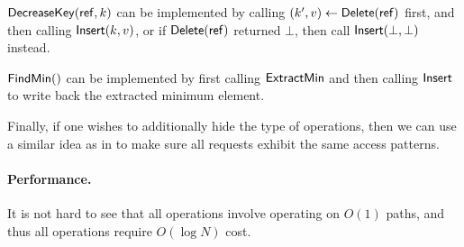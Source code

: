 \documentclass[11pt]{article}
\begin{document}
${\sf DecreaseKey}({\sf ref}, k)$
can be implemented 
by calling $(k', v) \leftarrow {\sf Delete}({\sf ref})$ 
first, and then 
calling ${\sf Insert}(k, v)$, or  
if ${\sf Delete}({\sf ref})$ returned $\bot$, then call 
${\sf Insert}(\bot, \bot)$ instead.  

${\sf FindMin}()$
can be implemented by first calling ${\sf ExtractMin}$
and then calling ${\sf Insert}$ to write back the extracted minimum element.

Finally, if one wishes to additionally hide
the type of operations, 
then we can 
use a similar idea as in 
to make sure all requests 
exhibit the same access patterns.

\paragraph{Performance.}
It is not hard to see that all operations
involve operating on $O(1)$ paths, and thus 
all operations require $O(\log N)$ cost. 
\end{document}
